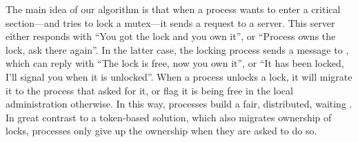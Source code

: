 The main idea of our algorithm is that when a process wants to enter a critical section---and tries to lock a mutex---it sends a request to a server.
This server either responds with ``You got the lock and you own it'', or ``Process \SYMproc owns the lock, ask there again''.
In the latter case, the locking process sends a message to \SYMproc, which can reply with ``The lock is free, now you own it'', or ``It has been locked, I'll signal you when it is unlocked''.
When a process unlocks a lock, it will migrate it to the process that asked for it, or flag it is being free in the local administration otherwise.
In this way, processes build a fair, distributed,  waiting .
In great contrast to a token-based solution, which also migrates ownership of locks, processes only give up the ownership when they are asked to do so.

